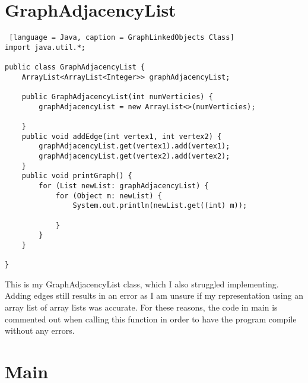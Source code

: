 \documentclass{article}
\begin{document}
\section{GraphAdjacencyList}

\begin{lstlisting} [language = Java, caption = GraphLinkedObjects Class]
import java.util.*;

public class GraphAdjacencyList {
    ArrayList<ArrayList<Integer>> graphAdjacencyList;

    public GraphAdjacencyList(int numVerticies) {
        graphAdjacencyList = new ArrayList<>(numVerticies);

    }
    public void addEdge(int vertex1, int vertex2) {
        graphAdjacencyList.get(vertex1).add(vertex1);
        graphAdjacencyList.get(vertex2).add(vertex2);
    }
    public void printGraph() {
        for (List newList: graphAdjacencyList) {
            for (Object m: newList) {
                System.out.println(newList.get((int) m));

            }
        }
    }
    
}

\end{lstlisting}

\noindent This is my GraphAdjacencyList class, which I also struggled implementing. Adding edges still results in an error as I am unsure if my representation using an array list of array lists was accurate. For these reasons, the code in main is commented out when calling this function in order to have the program compile without any errors. 

\section{Main}
\end{document}
